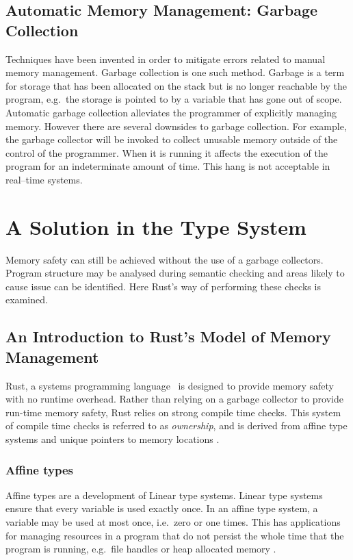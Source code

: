 

\subsection{Automatic Memory Management: Garbage Collection}
Techniques have been invented in order to mitigate errors related to manual
memory management. Garbage collection is one such method.  Garbage is a term
for storage that has been allocated on the stack but is no longer reachable by
the program, e.g.\ the storage is pointed to by a variable that has gone out of
scope. Automatic garbage collection alleviates the programmer of explicitly
managing memory. However there are several downsides to garbage collection. For
example, the garbage collector will be invoked to collect unusable memory
outside of the control of the programmer. When it is running it affects the
execution of the program for an indeterminate amount of time. This hang is not
acceptable in real--time systems.

\section{A Solution in the Type System}
Memory safety can still be achieved without the use of a garbage collectors.
Program structure may be analysed during semantic checking and areas likely to
cause issue can be identified. Here Rust's way of performing these checks is
examined.

\subsection{An Introduction to Rust's Model of Memory Management}
Rust, a systems programming language~\cite{rust} is designed to provide memory
safety with no runtime overhead. Rather than relying on a garbage collector to
provide run-time memory safety, Rust relies on strong compile time checks.
This system of compile time checks is referred to as \textit{ownership}, and is
derived from affine type systems and unique pointers to memory
locations\cite{rust-borrowing} \cite{levy2015ownership}.

\subsubsection{Affine types}
Affine types are a development of Linear type systems. Linear type systems
ensure that every variable is used exactly once. In an affine type system, a
variable may be used at most once, i.e.\ zero or one times. This has applications
for managing resources in a program that do not persist the whole time that the
program is running, e.g.\ file handles or heap allocated memory \cite{attapl}
\cite{tovAffine}.

